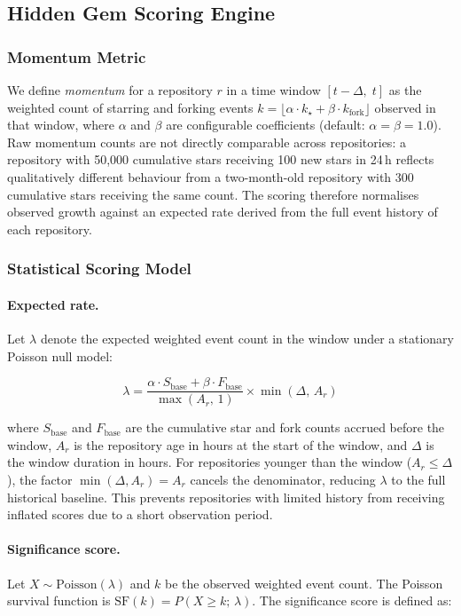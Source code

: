 \documentclass[sigconf]{acmart}
\begin{document}
\subsection{Hidden Gem Scoring Engine}
\label{sec:impl-hg}

\subsubsection{Momentum Metric}

We define \emph{momentum} for a repository $r$ in a time window
$[t - \Delta,\; t]$ as the weighted count of starring and forking events
$k = \lfloor\alpha \cdot k_{\star} + \beta \cdot k_{\mathrm{fork}}\rfloor$ observed
in that window, where $\alpha$ and $\beta$ are configurable coefficients
(default: $\alpha = \beta = 1.0$). Raw momentum counts are not directly
comparable across repositories: a repository with 50{,}000 cumulative stars
receiving 100 new stars in 24\,h reflects qualitatively different behaviour from
a two-month-old repository with 300 cumulative stars receiving the same count.
The scoring therefore normalises observed growth against an expected rate derived
from the full event history of each repository.

\subsubsection{Statistical Scoring Model}

\paragraph{Expected rate.}
Let $\lambda$ denote the expected weighted event count in the window under a
stationary Poisson null model:

$$\lambda = \frac{\alpha \cdot S_{\mathrm{base}} + \beta \cdot F_{\mathrm{base}}}
  {\max(A_r,\,1)} \times \min(\Delta,\,A_r)$$

where $S_{\mathrm{base}}$ and $F_{\mathrm{base}}$ are the cumulative star and fork
counts accrued before the window, $A_r$ is the repository age in hours at the
start of the window, and $\Delta$ is the window duration in hours. For
repositories younger than the window ($A_r \leq \Delta$), the factor
$\min(\Delta, A_r) = A_r$ cancels the denominator, reducing $\lambda$ to the
full historical baseline. This prevents repositories with limited history from
receiving inflated scores due to a short observation period.

\paragraph{Significance score.}
Let $X \sim \mathrm{Poisson}(\lambda)$ and $k$ be the observed weighted event
count. The Poisson survival function is
$\mathrm{SF}(k) = P(X \geq k;\,\lambda)$. The significance score is defined as:
\end{document}

